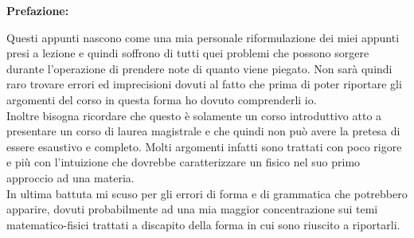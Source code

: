 \begin{titlepage}
\begin{center}
	\textbf{Prefazione:}
\end{center}

Questi appunti nascono come una mia personale riformulazione dei miei appunti presi a lezione e quindi soffrono di tutti quei problemi che possono sorgere durante l'operazione di prendere note di quanto viene piegato. Non sarà quindi raro trovare errori ed imprecisioni dovuti al fatto che prima di poter riportare gli argomenti del corso in questa forma ho dovuto comprenderli io. \\

Inoltre bisogna ricordare che questo è solamente un corso introduttivo atto a presentare un corso di laurea magistrale e che quindi non può avere la pretesa di essere esaustivo e completo. Molti argomenti infatti sono trattati con poco rigore e più con l'intuizione che dovrebbe caratterizzare un fisico nel suo primo approccio ad una materia.\\

In ultima battuta mi scuso per gli errori di forma e di grammatica che potrebbero apparire, dovuti probabilmente ad una mia maggior concentrazione sui temi matematico-fisici trattati a discapito della forma in cui sono riuscito a riportarli. 
\end{titlepage}